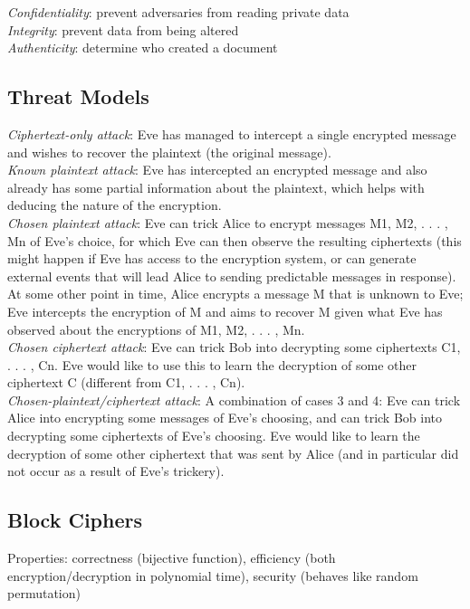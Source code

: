 \documentclass[10pt,landscape]{article}
\begin{document}
\begin{multicols}{3}
\textit{Confidentiality}: prevent adversaries from reading private data \\
\textit{Integrity}: prevent data from being altered \\
\textit{Authenticity}: determine who created a document

\subsection{Threat Models}

\textit{Ciphertext-only attack}: Eve has managed to intercept a single encrypted message and wishes to recover the plaintext (the original message). \\
\textit{Known plaintext attack}: Eve has intercepted an encrypted message and also already has some partial information about the plaintext, which helps with deducing the nature of the encryption. \\
\textit{Chosen plaintext attack}: Eve can trick Alice to encrypt messages M1, M2, . . . , Mn of Eve’s choice, for which Eve can then observe the resulting ciphertexts (this might happen if Eve has access to the encryption system, or can generate external events that will lead Alice to sending predictable messages in response). At some other point in time, Alice encrypts a message M that is unknown to Eve; Eve intercepts the encryption of M and aims to recover M given what Eve has observed about the encryptions of M1, M2, . . . , Mn. \\
\textit{Chosen ciphertext attack}: Eve can trick Bob into decrypting some ciphertexts C1, . . . , Cn. Eve would like to use this to learn the decryption of some other ciphertext C (different from C1, . . . , Cn). \\
\textit{Chosen-plaintext/ciphertext attack}: A combination of cases 3 and 4: Eve can trick Alice into encrypting some messages of Eve’s choosing, and can trick Bob into decrypting some ciphertexts of Eve’s choosing. Eve would like to learn the decryption of some other ciphertext that was sent by Alice (and in particular did not occur as a result of Eve’s trickery).

\subsection{Block Ciphers}

Properties: correctness (bijective function), efficiency (both encryption/decryption in polynomial time), security (behaves like random permutation)


\end{multicols}
\end{document}
